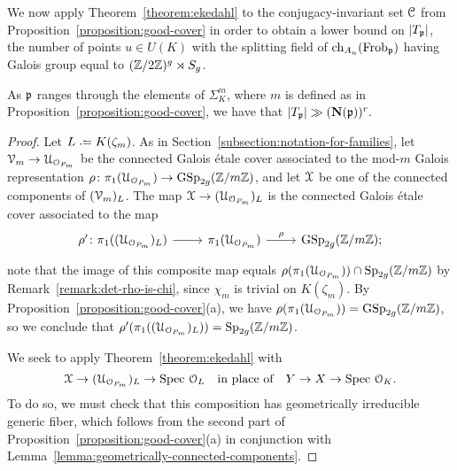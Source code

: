 We now apply Theorem~\ref{theorem:ekedahl} to the
	conjugacy-invariant set $\mathcal C$ from Proposition~\ref{proposition:good-cover} in order to obtain a lower bound on $|T_\mathfrak p|$, the number of points $u \in U(K)$ with the splitting field of $\operatorname{ch}_{A_u}(\operatorname{Frob}_\mathfrak p)$ having Galois group equal to $({\mathbb Z}/2{\mathbb Z})^g \rtimes S_g$.
\begin{proposition}\label{proposition:good-v}
	As $\mathfrak{p}$ ranges through the elements of $\Sigma_K^m$, where $m$ is defined as in Proposition~\ref{proposition:good-cover}, we have that
	\(
	|T_{\mathfrak{p}}| \gg (\mathbf{N} ({\mathfrak{p}}))^r.
	\)
\end{proposition}
\begin{proof}
 Let $L \defeq K(\zeta_m)$. As in Section~\ref{subsection:notation-for-families}, let $\mathcal{V}_m \to \mathcal{U}_{\mathcal O_{P_m}}$ be the connected Galois \'etale cover associated to the mod-$m$ Galois representation $\rho \colon \pi_1(\mathcal{U}_{\mathcal O_{P_m}}) \to \operatorname{GSp}_{2g}({\mathbb Z} / m {\mathbb Z})$, and
let $\mathcal{X}$ be one of the connected components of $(\mathcal{V}_m)_{L}$. The map $\mathcal{X} \to (\mathcal{U}_{\mathcal O_{P_m}})_{L}$ is the connected Galois \'etale cover associated to the map
	\[
		\begin{tikzcd}
			\rho' \colon \pi_1((\mc{U}_{\OO_{P_m}})_{L}) \ar{r} & \pi_1(\mc{U}_{\OO_{P_m}}) \ar{r}{\rho} & \GSp_{2g}(\bz / m \bz);
		\end{tikzcd}
	\]
	note that the image of this composite map equals $\rho(\pi_1(\mathcal{U}_{\mathcal O_{P_m}})) \cap \operatorname{Sp}_{2g}({\mathbb Z} / m {\mathbb Z})$ by Remark~\ref{remark:det-rho-is-chi},
	since $\chi_m$ is trivial on $K(\zeta_m)$. By Proposition~\ref{proposition:good-cover}(a), we have $\rho(\pi_1(\mathcal{U}_{\mathcal O_{P_m}})) = \operatorname{GSp}_{2g}({\mathbb Z} / m {\mathbb Z})$, so we conclude that $\rho'(\pi_1((\mathcal{U}_{\mathcal O_{P_m}})_{L})) = \operatorname{Sp}_{2g}({\mathbb Z} / m {\mathbb Z})$.
	
	We seek to apply Theorem~\ref{theorem:ekedahl} with
	\[
		\mathcal{X} \to (\mathcal{U}_{\mathcal O_{P_m}})_{L} \to \text{Spec } \mathcal{O}_{L} \quad \text{in place of} \quad Y \to X \to \text{Spec } \mathcal{O}_K.
	\]
	To do so, we must check that this composition has geometrically irreducible generic fiber, which follows from the second part of Proposition~\ref{proposition:good-cover}(a) in conjunction with Lemma~\ref{lemma:geometrically-connected-components}.
	

\end{proof}
